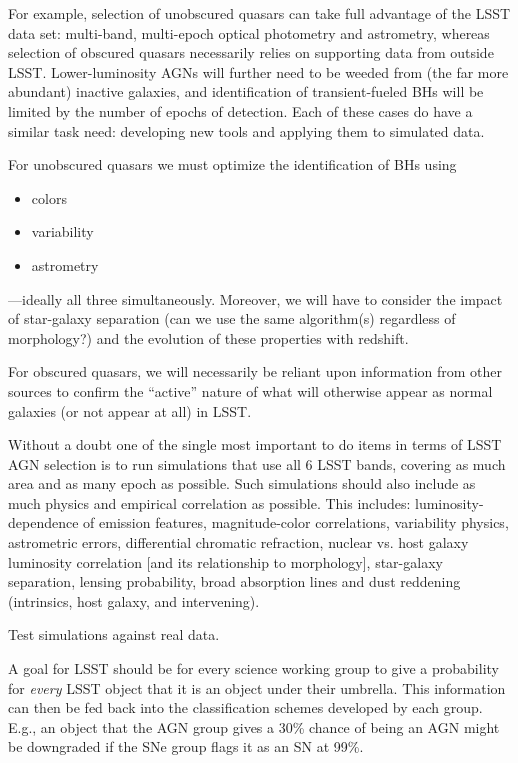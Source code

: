 For example, selection of unobscured quasars can take full advantage
of the LSST data set: multi-band, multi-epoch optical photometry and
astrometry, whereas selection of obscured quasars necessarily relies
on supporting data from outside LSST.  Lower-luminosity AGNs will
further need to be weeded from (the far more abundant) inactive
galaxies, and identification of transient-fueled BHs will be limited
by the number of epochs of detection.  Each of these cases do have a
similar task need: developing new tools and applying them to simulated
data.

For unobscured quasars we must optimize the identification of BHs using
\begin{itemize}
\item colors
\item variability
\item astrometry
\end{itemize}
---ideally all three simultaneously.  Moreover, we will have to
consider the impact of star-galaxy separation (can we use the same
algorithm(s) regardless of morphology?) and the evolution of these
properties with redshift.

For obscured quasars, we will necessarily be reliant upon information
from other sources to confirm the ``active'' nature of what will
otherwise appear as normal galaxies (or not appear at all) in LSST.

Without a doubt one of the single most important to do items in terms
of LSST AGN selection is to run simulations that use all 6 LSST bands,
covering as much area and as many epoch as possible.  Such simulations
should also include as much physics and empirical correlation as
possible.  This includes: luminosity-dependence of emission features,
magnitude-color correlations, variability physics, astrometric errors,
differential chromatic refraction, nuclear vs. host galaxy luminosity
correlation [and its relationship to morphology], star-galaxy
separation, lensing probability, broad absorption lines and dust
reddening (intrinsics, host galaxy, and intervening). 

Test simulations against real data.

A goal for LSST should be for every science working group to give a
probability for {\em every} LSST object that it is an object under
their umbrella.  This information can then be fed back into the
classification schemes developed by each group.  E.g., an object that
the AGN group gives a 30\% chance of being an AGN might be downgraded
if the SNe group flags it as an SN at 99\%.

